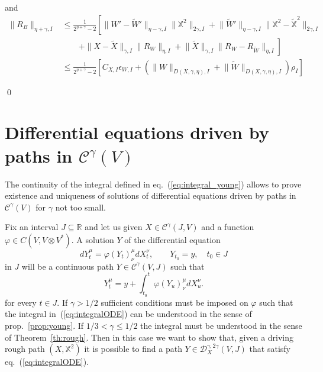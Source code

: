 \documentclass[a4paper,12pt,reqno]{amsproc}
\newcommand{\CC}{\mathcal{C}}
\newcommand{\DD}{\mathcal{D}}
\newcommand{\norm}[1]{\lVert #1\rVert}
\newcommand{\wt}{\widetilde}
\begin{document}
and
\begin{equation*}
  \begin{split}
\norm{R_B}_{\eta+\gamma,I}& \le \frac{1}{2^{\eta+\gamma}-2}\left[ 
\norm{W'-\wt W'}_{\eta-\gamma,I}
\norm{\mathbb{X}^2}_{2\gamma,I}+\norm{\wt W'}_{\eta-\gamma,I}
\norm{\mathbb{X}^2-\mathbb{\wt X}^2}_{2\gamma,I}
\right. \\ &\qquad  
\left. +
\norm{X-\wt X}_{\gamma,I} \norm{R_W}_{\eta,I}+\norm{\wt X}_{\gamma,I}
\norm{R_W-R_{\wt W}}_{\eta,I}
\right]    
\\ & \le  \frac{1}{2^{\eta+\gamma}-2}\left[ C_{X,I} \epsilon_{W,I} +
  (\norm{W}_{D(X,\gamma,\eta),I} +\norm{\wt
    W}_{D(X,\gamma,\eta),I})\rho_I\right]
  \end{split}
\end{equation*}

\qed

\section{Differential equations driven by paths in $\CC^\gamma(V)$}
\label{sec:ode}
The continuity of the integral defined in eq.~(\ref{eq:integral_young}) allows
to prove existence and uniqueness of solutions of differential
equations driven by paths in $\CC^\gamma(V)$ for $\gamma$ not too small.

Fix an interval $J \subseteq \mathbb{R}$ and
let us given $X \in \CC^\gamma(J,V)$ and a function $\varphi \in
C(V,V \otimes V^*)$. 
A solution $Y$ of the differential
equation
\begin{equation}
\label{eq:diff_eq_young}
dY^\mu_t = \varphi(Y_t)^\mu_\nu dX^\nu_t, \qquad Y_{t_0} = y, \quad
t_0 \in J  
\end{equation}
in $J$ will be a continuous path $Y \in \CC^\gamma(V,J)$ such that
\begin{equation}
\label{eq:integralODE}
Y_t^\mu = y + \int_{t_0}^t \varphi(Y_u)^\mu_\nu dX^\nu_u.  
\end{equation}
for every $t \in J$. If $\gamma > 1/2$ sufficient conditions must be
imposed on $\varphi$ such that the integral
in~(\ref{eq:integralODE}) can be understood in the sense of
prop.~\ref{prop:young}. If $1/3 < \gamma \le 1/2$ the integral must be
understood in the sense of Theorem~\ref{th:rough}. Then in this case we want to
show that, given a driving rough path $(X,\mathbb{X}^2)$ it is possible to find a path $Y \in
\DD_X^{\gamma,2\gamma}(V,J)$ that satisfy eq.~(\ref{eq:integralODE}).
\end{document}

